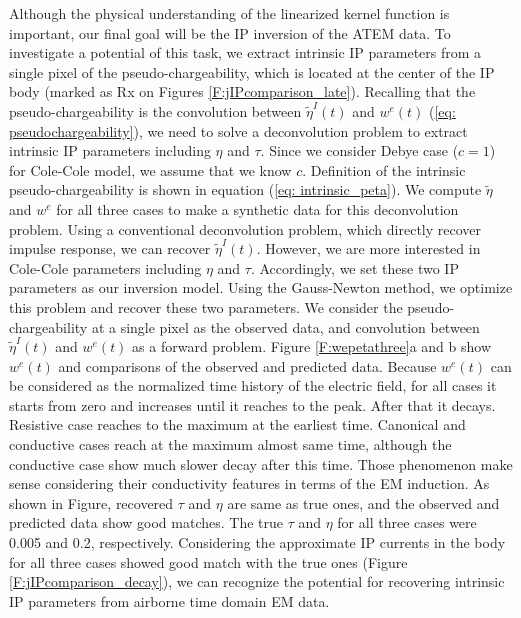 \documentclass[a4paper, 11pt]{article}
\newcommand{\peta}{\tilde{\eta}}
\begin{document}
Although the physical understanding of the linearized kernel function is important, our final goal will be the IP inversion of the ATEM data. To investigate a potential of this task, we extract intrinsic IP parameters from a single pixel of the pseudo-chargeability, which is located at the center of the IP body (marked as Rx on Figures \ref{F:jIPcomparison_late}). Recalling that the pseudo-chargeability is the convolution between $\peta^{I}(t)$ and $w^{e}(t)$ (\ref{eq: pseudochargeability}), we need to solve a deconvolution problem to extract intrinsic IP parameters including $\eta$ and $\tau$. Since we consider Debye case ($c=1$) for Cole-Cole model, we assume that we know $c$. Definition of the intrinsic pseudo-chargeability is shown in equation (\ref{eq: intrinsic_peta}). We compute $\peta$ and $w^e$ for all three cases to make a synthetic data for this deconvolution problem. Using a conventional deconvolution problem, which directly recover impulse response, we can recover $\peta^{I}(t)$. However, we are more interested in Cole-Cole parameters including $\eta$ and $\tau$. Accordingly, we set these two IP parameters as our inversion model. Using the Gauss-Newton method, we optimize this problem and recover these two parameters. We consider the pseudo-chargeability at a single pixel as the observed data, and convolution between $\peta^{I}(t)$ and $w^e(t)$ as a forward problem. Figure \ref{F:wepetathree}a and b show $w^e(t)$ and comparisons of the observed and predicted data. Because $w^e(t)$ can be considered as the normalized time history of the electric field, for all cases it starts from zero and increases until it reaches to the peak.  After that it decays. Resistive case reaches to the maximum at the earliest time. Canonical and conductive cases reach at the maximum almost same time, although the conductive case show much slower decay after this time. Those phenomenon make sense considering their conductivity features in terms of the EM induction. As shown in Figure, recovered $\tau$ and $\eta$ are same as true ones, and the observed and predicted data show good matches. The true $\tau$ and $\eta$ for all three cases were 0.005 and 0.2, respectively. Considering the approximate IP currents in the body for all three cases showed good match with the true ones (Figure \ref{F:jIPcomparison_decay}), we can recognize the potential for recovering intrinsic IP parameters from airborne time domain EM data. 
\end{document}
